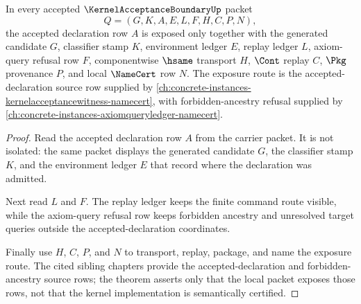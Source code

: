 \begin{theorem}
\label{thm:kernel-acceptance-boundary-accepted-declaration-exposure}
In every accepted $\KernelAcceptanceBoundaryUp$ packet
$$
Q=(G,K,A,E,L,F,H,C,P,N),
$$
the accepted declaration row $A$ is exposed only together with the generated candidate $G$, classifier stamp $K$, environment ledger $E$, replay ledger $L$, axiom-query refusal row $F$, componentwise $\hsame$ transport $H$, $\Cont$ replay $C$, $\Pkg$ provenance $P$, and local $\NameCert$ row $N$. The exposure route is the accepted-declaration source row supplied by \autoref{ch:concrete-instances-kernelacceptancewitness-namecert}, with forbidden-ancestry refusal supplied by \autoref{ch:concrete-instances-axiomqueryledger-namecert}.
\end{theorem}
\begin{proof}
Read the accepted declaration row $A$ from the carrier packet. It is not isolated: the same packet displays the generated candidate $G$, the classifier stamp $K$, and the environment ledger $E$ that record where the declaration was admitted.

Next read $L$ and $F$. The replay ledger keeps the finite command route visible, while the axiom-query refusal row keeps forbidden ancestry and unresolved target queries outside the accepted-declaration coordinates.

Finally use $H$, $C$, $P$, and $N$ to transport, replay, package, and name the exposure route. The cited sibling chapters provide the accepted-declaration and forbidden-ancestry source rows; the theorem asserts only that the local packet exposes those rows, not that the kernel implementation is semantically certified.
\end{proof}

